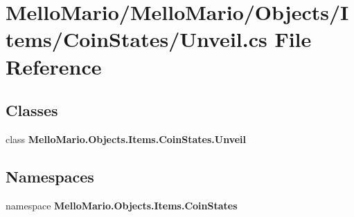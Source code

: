 \section{Mello\+Mario/\+Mello\+Mario/\+Objects/\+Items/\+Coin\+States/\+Unveil.cs File Reference}
\label{CoinStates_2Unveil_8cs}
\subsection*{Classes}
\begin{DoxyCompactItemize}
\item 
class \textbf{ Mello\+Mario.\+Objects.\+Items.\+Coin\+States.\+Unveil}
\end{DoxyCompactItemize}
\subsection*{Namespaces}
\begin{DoxyCompactItemize}
\item 
namespace \textbf{ Mello\+Mario.\+Objects.\+Items.\+Coin\+States}
\end{DoxyCompactItemize}

